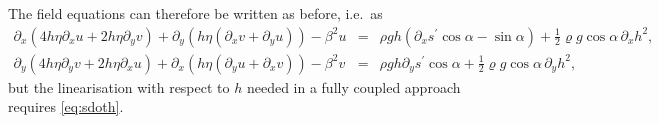 \documentclass[10pt,a4paper]{book}
\newcommand{\He}{\mathcal{H}}
\newcommand{\p}{\partial}
\begin{document}
% 

The field equations can therefore be written as before, i.e.\ as
\begin{eqnarray} 
\p_x ( 4 h \eta \p_x u + 2 h \eta \p_y v) + \p_y ( h \eta (\p_x v + \p_y u)) - \beta^2 u 
&=&\rho g h (\p_x s^{'} \cos \alpha  -  \sin \alpha )    + \frac{1}{2} \varrho g  \cos \alpha \, \p_x h^2,\nonumber \\
\p_y ( 4 h \eta \p_y v + 2 h \eta \p_x u) +\p_x ( h \eta (\p_y u + \p_x v)) - \beta^2 v 
&=&\rho g h \p_y s^{'} \cos \alpha  +\frac{1}{2} \varrho g  \cos \alpha \, \p_y h^2 , \nonumber
\end{eqnarray}
but the linearisation with respect to $h$ needed in a fully coupled approach requires \eqref{eq:sdoth}.
\end{document}
